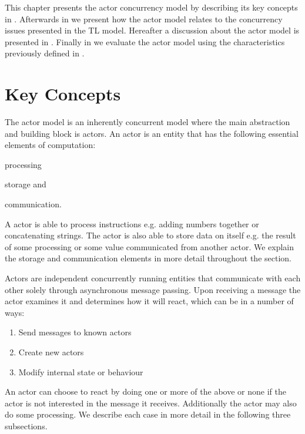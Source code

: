 \makeatletter {}\makeatother
{}
This chapter presents the actor concurrency model by describing its key concepts in . Afterwards in  we present how the actor model relates to the concurrency issues presented in the \ac{TL} model. Hereafter a discussion about the actor model is presented in . Finally in  we evaluate the actor model using the characteristics previously defined in .
\label{chap:actor}

\section{Key Concepts}\label{sec:actor_concepts}
The actor model is an inherently concurrent model where the main abstraction and building block is actors\cite[p. 2]{karmani2009actor}. An actor is an entity that has the following essential elements of computation\cite{actorLangNextVideo}:
\begin{inparaenum}[(1)]
\item processing
\item storage and
\item communication.
\end{inparaenum} 
A actor is able to process instructions e.g. adding numbers together or concatenating strings. The actor is also able to store data on itself e.g. the result of some processing or some value communicated from another actor. We explain the storage and communication elements in more detail throughout the section.

Actors are independent concurrently running entities that communicate with each other solely through asynchronous message passing\cite[p. 304]{tasharofi2013scala}. Upon receiving a message the actor examines it and determines how it will react, which can be in a number of ways\cite[p. 2]{hewitt2014actor}:
\begin{enumerate}
\item Send messages to known actors
\item Create new actors
\item Modify internal state or behaviour
\end{enumerate}
An actor can choose to react by doing one or more of the above or none if the actor is not interested in the message it receives. Additionally the actor may also do some processing. We describe each case in more detail in the following three subsections.

